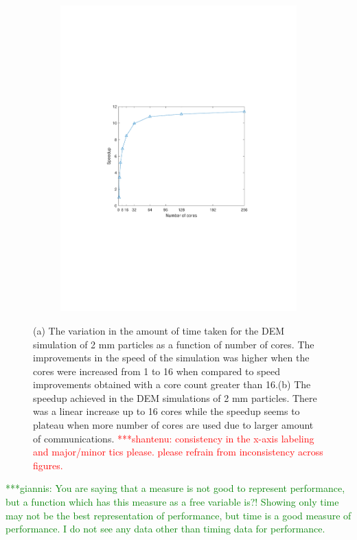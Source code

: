 \documentclass[preprint,11pt,authoryear]{elsarticle}
\newcommand{\jhanote}[1]{ {\textcolor{red} { ***shantenu: #1 }}}
\newcommand{\gpnote}[1]{{\textcolor{green} {***giannis: #1}}}
\newcommand{\jhanote}[1]{ {\textcolor{red} { ***shantenu: #1 }}}
\newcommand{\gpnote}[1]{}
\begin{document}
\begin{figure}
\begin{subfigure}{.45\textwidth}
\includegraphics[scale=0.6]{rslsts_2mm_DEM_speedup_mtlb.pdf}
\caption{}
\label{fig:rslts_DEM_speedup}
\end{subfigure}
\caption{(a) The variation in the amount of time taken for the DEM simulation of 2 mm particles as 
a function of number of cores. The improvements in the speed of the simulation was higher when the 
cores were increased from 1 to 16 when compared to speed improvements obtained with a core count greater 
than 16.(b) The speedup achieved in the DEM simulations of 2 mm particles. There 
was a linear increase up to 16 cores while the speedup seems to plateau when 
more number of cores are used due to larger amount of communications.
\jhanote{consistency in the x-axis labeling and major/minor tics please. please refrain from inconsistency across figures.}}
\end{figure} 


\gpnote{You are saying that a measure is not good to represent performance, but a function which has
this measure as a free variable is?! Showing only time may not be the best representation of performance,
but time is a good measure of performance. I do not see any data other than timing data for performance.} 
\end{document}
